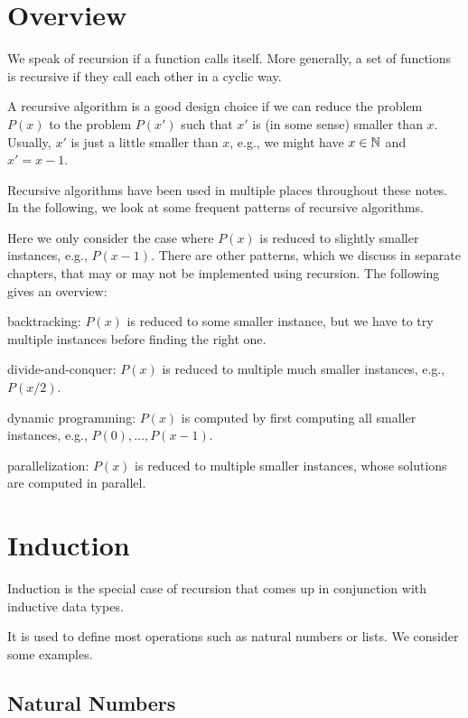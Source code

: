 \section{Overview}

We speak of recursion if a function calls itself.
More generally, a set of functions is recursive if they call each other in a cyclic way.

A recursive algorithm is a good design choice if we can reduce the problem $P(x)$ to the problem $P(x')$ such that $x'$ is (in some sense) smaller than $x$.
Usually, $x'$ is just a little smaller than $x$, e.g., we might have $x\in\mathbb{N}$ and $x'=x-1$.

Recursive algorithms have been used in multiple places throughout these notes.
In the following, we look at some frequent patterns of recursive algorithms.

Here we only consider the case where $P(x)$ is reduced to slightly smaller instances, e.g., $P(x-1)$.
There are other patterns, which we discuss in separate chapters, that may or may not be implemented using recursion.
The following gives an overview:
\begin{compactitem}
  \item backtracking: $P(x)$ is reduced to some smaller instance, but we have to try multiple instances before finding the right one.
  \item divide-and-conquer: $P(x)$ is reduced to multiple much smaller instances, e.g., $P(x/2)$.
  \item dynamic programming: $P(x)$ is computed by first computing all smaller instances, e.g., $P(0),\ldots,P(x-1)$.
  \item parallelization: $P(x)$ is reduced to multiple smaller instances, whose solutions are computed in parallel.
\end{compactitem}

\section{Induction}

Induction is the special case of recursion that comes up in conjunction with inductive data types.

It is used to define most operations  such as natural numbers or lists.
We consider some examples.

\subsection{Natural Numbers}

